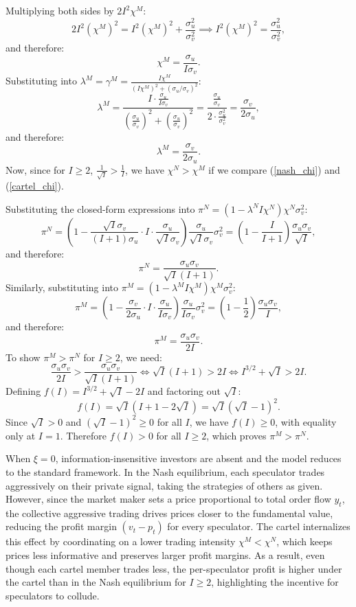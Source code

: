 \documentclass[11pt]{article}
\begin{document}
Multiplying both sides by $2I^2\chi^M$:
\[
2I^2(\chi^M)^2 = I^2(\chi^M)^2 + \frac{\sigma_u^2}{\sigma_v^2} \implies I^2(\chi^M)^2 = \frac{\sigma_u^2}{\sigma_v^2},
\]
and therefore:
\begin{equation}
    \chi^M = \frac{\sigma_u}{I\sigma_v}.
    \label{cartel_chi}
\end{equation}
Substituting into $\lambda^M = \gamma^M = \frac{I\chi^M}{(I\chi^M)^2+(\sigma_u/\sigma_v)^2}$:
\[
\lambda^M = \frac{I\cdot\frac{\sigma_u}{I\sigma_v}}{\left(\frac{\sigma_u}{\sigma_v}\right)^2+\left(\frac{\sigma_u}{\sigma_v}\right)^2} = \frac{\frac{\sigma_u}{\sigma_v}}{2\cdot\frac{\sigma_u^2}{\sigma_v^2}} = \frac{\sigma_v}{2\sigma_u},
\]
and therefore:
\begin{equation}
    \lambda^M = \frac{\sigma_v}{2\sigma_u}.
\end{equation}
Now, since for $I\ge 2$, $\frac{1}{\sqrt{I}}>\frac{1}{I}$, we have $\chi^N>\chi^M$ if we compare (\ref{nash_chi}) and (\ref{cartel_chi}).

Substituting the closed-form expressions into $\pi^N=(1-\lambda^N I\chi^N)\chi^N\sigma_v^2$:
\[
\pi^N = \left(1 - \frac{\sqrt{I}\sigma_v}{(I+1)\sigma_u}\cdot I\cdot\frac{\sigma_u}{\sqrt{I}\sigma_v}\right)\frac{\sigma_u}{\sqrt{I}\sigma_v}\sigma_v^2 = \left(1 - \frac{I}{I+1}\right)\frac{\sigma_u\sigma_v}{\sqrt{I}},
\]
and therefore:
\begin{equation}
    \pi^N = \frac{\sigma_u\sigma_v}{\sqrt{I}(I+1)}.
\end{equation}
Similarly, substituting into $\pi^M=(1-\lambda^M I\chi^M)\chi^M\sigma_v^2$:
\[
\pi^M = \left(1 - \frac{\sigma_v}{2\sigma_u}\cdot I\cdot\frac{\sigma_u}{I\sigma_v}\right)\frac{\sigma_u}{I\sigma_v}\sigma_v^2 = \left(1-\frac{1}{2}\right)\frac{\sigma_u\sigma_v}{I},
\]
and therefore:
\begin{equation}
    \pi^M = \frac{\sigma_u\sigma_v}{2I}.
\end{equation}
To show $\pi^M>\pi^N$ for $I\ge 2$, we need:
\[
\frac{\sigma_u\sigma_v}{2I}>\frac{\sigma_u\sigma_v}{\sqrt{I}(I+1)} \iff \sqrt{I}(I+1)>2I \iff I^{3/2}+\sqrt{I}>2I.
\]
Defining $f(I)=I^{3/2}+\sqrt{I}-2I$ and factoring out $\sqrt{I}$:
\[
f(I)=\sqrt{I}(I+1-2\sqrt{I})=\sqrt{I}(\sqrt{I}-1)^2.
\]
Since $\sqrt{I}>0$ and $(\sqrt{I}-1)^2\ge 0$ for all $I$, we have $f(I)\ge 0$, with equality only at $I=1$. Therefore $f(I)>0$ for all $I\ge 2$, which proves $\pi^M>\pi^N$.

When $\xi=0$, information-insensitive investors are absent and the model reduces to the standard \citet{Kyle1985} framework. In the Nash equilibrium, each speculator trades aggressively on their private signal, taking the strategies of others as given. However, 
since the market maker sets a price proportional to total order flow $y_t$, the collective 
aggressive trading drives prices closer to the fundamental value, reducing the profit 
margin $(v_t-p_t)$ for every speculator. The cartel internalizes this effect by 
coordinating on a lower trading intensity $\chi^M<\chi^N$, which keeps prices less 
informative and preserves larger profit margins. As a result, even though each cartel member trades less, the per-speculator profit is 
higher under the cartel than in the Nash equilibrium for $I\ge 2$, highlighting the 
incentive for speculators to collude.
\end{document}
